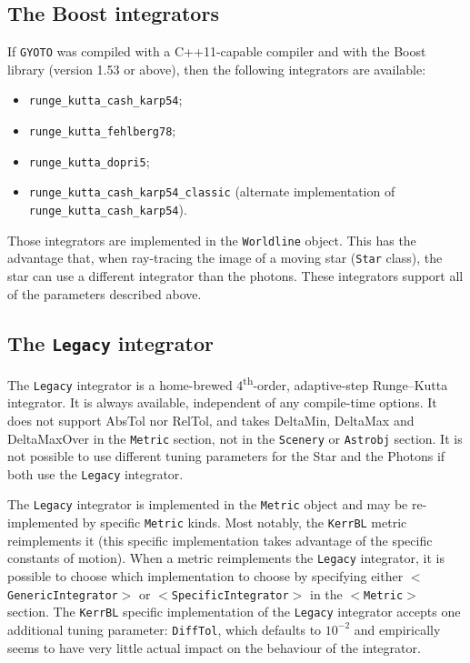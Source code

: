 \documentclass[a4paper,12pt]{article}
\begin{document}
\subsection{The Boost integrators}

If \texttt{GYOTO} was compiled with a C++11-capable compiler and with
the Boost library (version 1.53 or above), then the following
integrators are available:
\begin{itemize}
\item \texttt{runge\_kutta\_cash\_karp54};
\item \texttt{runge\_kutta\_fehlberg78};
\item \texttt{runge\_kutta\_dopri5};
\item \texttt{runge\_kutta\_cash\_karp54\_classic} (alternate
  implementation of \texttt{runge\_kutta\_cash\_karp54}).
\end{itemize}

Those integrators are implemented in the \texttt{Worldline}
object. This has the advantage that, when ray-tracing the image of a
moving star (\texttt{Star} class), the star can use a different
integrator than the photons. These integrators support all of the
parameters described above.


\subsection{The \texttt{Legacy} integrator}

The \texttt{Legacy} integrator is a home-brewed
4\textsuperscript{th}-order, adaptive-step Runge--Kutta integrator. It
is always available, independent of any compile-time options. It does
not support AbsTol nor RelTol, and takes DeltaMin, DeltaMax and
DeltaMaxOver in the \texttt{Metric} section, not in the
\texttt{Scenery} or \texttt{Astrobj} section. It is not possible to
use different tuning parameters for the Star and the Photons if both
use the \texttt{Legacy} integrator.

The \texttt{Legacy} integrator is implemented in the \texttt{Metric}
object and may be re-implemented by specific \texttt{Metric}
kinds. Most notably, the \texttt{KerrBL} metric reimplements it (this
specific implementation takes advantage of the specific constants of
motion). When a metric reimplements the \texttt{Legacy} integrator, it
is possible to choose which implementation to choose by specifying
either \texttt{$<$GenericIntegrator$>$} or
\texttt{$<$SpecificIntegrator$>$} in the \texttt{$<$Metric$>$}
section. The \texttt{KerrBL} specific implementation of the
\texttt{Legacy} integrator accepts one additional tuning parameter:
\texttt{DiffTol}, which defaults to $10^{-2}$ and empirically seems to
have very little actual impact on the behaviour of the integrator.
\end{document}
